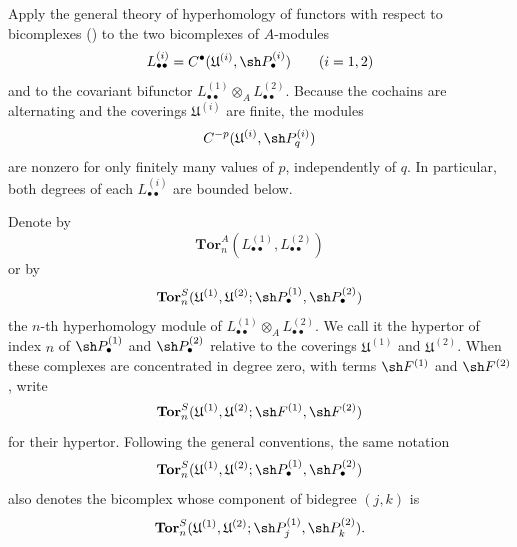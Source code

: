 \begin{env}[6.6.2]
\label{III.6.6.2}
Apply the general theory of hyperhomology of functors with
respect to bicomplexes () to the two
bicomplexes of $A$-modules
\[
  L_{\bullet\bullet}^{(i)}
  =
  C^\bullet(\mathfrak U^{(i)},\sh P_\bullet^{(i)})
  \qquad(i=1,2)
\]
and to the covariant bifunctor
$L_{\bullet\bullet}^{(1)}\otimes_A
 L_{\bullet\bullet}^{(2)}$.
Because the cochains are alternating and the coverings
$\mathfrak U^{(i)}$ are finite, the modules
\[
  C^{-p}(\mathfrak U^{(i)},\sh P_q^{(i)})
\]
are nonzero for only finitely many values of $p$, independently
of $q$.  In particular, both degrees of each
$L_{\bullet\bullet}^{(i)}$ are bounded below.

Denote by
\[
  \mathbf{Tor}_n^A
  (L_{\bullet\bullet}^{(1)},L_{\bullet\bullet}^{(2)})
\]
or by
\[
  \mathbf{Tor}_n^S
  (\mathfrak U^{(1)},\mathfrak U^{(2)};
   \sh P_\bullet^{(1)},\sh P_\bullet^{(2)})
\]
the $n$-th hyperhomology module of
$L_{\bullet\bullet}^{(1)}\otimes_A
 L_{\bullet\bullet}^{(2)}$.  We call it the hypertor of index
$n$ of $\sh P_\bullet^{(1)}$ and $\sh P_\bullet^{(2)}$ relative
to the coverings $\mathfrak U^{(1)}$ and
$\mathfrak U^{(2)}$.  When these complexes are concentrated in
degree zero, with terms $\sh F^{(1)}$ and $\sh F^{(2)}$, write
\[
  \mathbf{Tor}_n^S
  (\mathfrak U^{(1)},\mathfrak U^{(2)};
   \sh F^{(1)},\sh F^{(2)})
\]
for their hypertor.  Following the general conventions, the
same notation
\[
  \mathbf{Tor}_n^S
  (\mathfrak U^{(1)},\mathfrak U^{(2)};
   \sh P_\bullet^{(1)},\sh P_\bullet^{(2)})
\]
also denotes the bicomplex whose component of bidegree $(j,k)$
is
\[
  \mathbf{Tor}_n^S
  (\mathfrak U^{(1)},\mathfrak U^{(2)};
   \sh P_j^{(1)},\sh P_k^{(2)}).
\]


\end{env}
